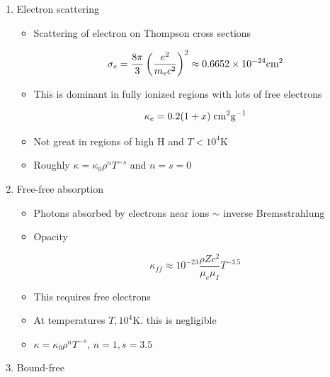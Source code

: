 \documentclass{article}
\begin{document}
\begin{enumerate}
    \item Electron scattering

    \begin{itemize}
        \item Scattering of electron on Thompson cross sections

        \begin{equation}
            \sigma_e = \frac{8\pi}{3}\left(\frac{e^2}{m_ec^2}\right)^2 \approx0.6652\times 10^{-24} {\rm cm^2}
        \end{equation}

        \item This is dominant in fully ionized regions with lots of free electrons

        \begin{equation}
            \kappa_e = 0.2(1+x)\;{\rm cm^2g^{-1}}
        \end{equation}

        \item Not great in regions of high H and $T<10^4$K

        \item Roughly $\kappa = \kappa_0 \rho^nT^{-s}$ and $n=s=0$
    \end{itemize}


    \item Free-free absorption

    \begin{itemize}
        \item Photons absorbed by electrons near ions $\sim$ inverse Bremsstrahlung

        \item Opacity

        \begin{equation}
            \kappa_{ff} \approx 10^{-23}\frac{\rho Z c^2}{\mu_e\mu_I}T^{-3.5}
        \end{equation}

        \item This requires free electrons

        \item At temperatures $T , 10^4$K. this is negligible

        \item $\kappa = \kappa_0\rho^nT^{-s}$, $n=1, s=3.5$
    \end{itemize}

    \item Bound-free


\end{enumerate}
\end{document}
